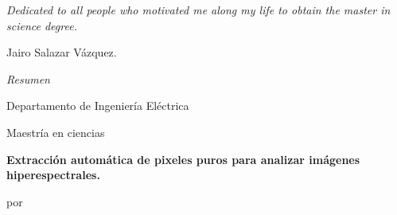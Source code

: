 \documentclass[11pt, oneside]{Thesis} %
\begin{document}
\pagestyle{empty} %

\null\vfill %

\textit{Dedicated to all people who motivated me along my life to obtain the master in science degree.}

\begin{flushright}
Jairo Salazar Vázquez.
\end{flushright}

\vfill\vfill\vfill\vfill\vfill\vfill\null %

\clearpage %


\begin{center}
    \setlength{\parskip}{0pt}
    {\huge{\textit{Resumen}} \par}
    \bigskip
    {\normalsize \facname \par} %
    {\normalsize Departamento de Ingeniería Eléctrica \par} %
    \bigskip
    {\normalsize Maestría en ciencias \par} %
    \bigskip
    {\normalsize\bf Extracción automática de pixeles puros para analizar imágenes hiperespectrales. \par} %
    \medskip
    {\normalsize por \authornames \par} %
    \bigskip
\end{center}
\end{document}
